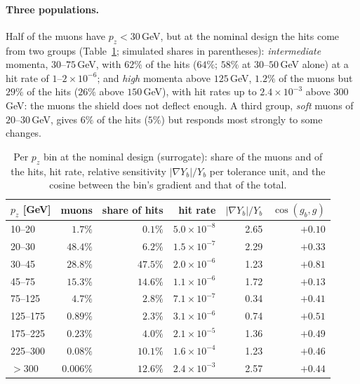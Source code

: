 \documentclass[11pt,a4paper]{article}
\begin{document}
\paragraph{Three populations.}
Half of the muons have $p_z<30$\,GeV, but at the nominal design the hits come from two groups
(Table~\ref{tab:pz}; simulated shares in parentheses): \emph{intermediate} momenta,
$30$--$75$\,GeV, with $62\%$ of the hits ($64\%$; $58\%$ at $30$--$50$\,GeV alone) at a hit rate
of $1$--$2\times10^{-6}$; and \emph{high} momenta above $125$\,GeV, $1.2\%$ of the muons but
$29\%$ of the hits ($26\%$ above $150$\,GeV), with hit rates up to $2.4\times10^{-3}$ above
$300$\,GeV: the muons the shield does not deflect enough. A third group, \emph{soft} muons of
$20$--$30$\,GeV, gives $6\%$ of the hits ($5\%$) but responds most strongly to some changes.

\begin{table}[t]
\centering
\caption{Per $p_z$ bin at the nominal design (surrogate): share of the muons and of the hits, hit
rate, relative sensitivity $|\nabla Y_b|/Y_b$ per tolerance unit, and the cosine between the
bin's gradient and that of the total.}
\label{tab:pz}
\begin{tabular}{lrrrrr}
\toprule
$p_z$ [GeV] & muons & share of hits & hit rate & $|\nabla Y_b|/Y_b$ & $\cos(g_b, g)$ \\
\midrule
10--20   & $1.7\%$   & $0.1\%$  & $5.0\times10^{-8}$ & 2.65 & $+0.10$ \\
20--30   & $48.4\%$  & $6.2\%$  & $1.5\times10^{-7}$ & 2.29 & $+0.33$ \\
30--45   & $28.8\%$  & $47.5\%$ & $2.0\times10^{-6}$ & 1.23 & $+0.81$ \\
45--75   & $15.3\%$  & $14.6\%$ & $1.1\times10^{-6}$ & 1.72 & $+0.13$ \\
75--125  & $4.7\%$   & $2.8\%$  & $7.1\times10^{-7}$ & 0.34 & $+0.41$ \\
125--175 & $0.89\%$  & $2.3\%$  & $3.1\times10^{-6}$ & 0.74 & $+0.51$ \\
175--225 & $0.23\%$  & $4.0\%$  & $2.1\times10^{-5}$ & 1.36 & $+0.49$ \\
225--300 & $0.08\%$  & $10.1\%$ & $1.6\times10^{-4}$ & 1.23 & $+0.46$ \\
$>300$   & $0.006\%$ & $12.6\%$ & $2.4\times10^{-3}$ & 2.57 & $+0.44$ \\
\bottomrule
\end{tabular}
\end{table}
\end{document}
